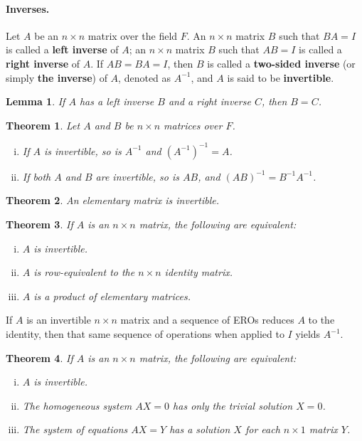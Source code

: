 \documentclass{article}
\newtheorem{theorem}{Theorem}[section]
\newtheorem*{lemma*}{Lemma}
\begin{document}
\paragraph{Inverses.} Let $A$ be an $n \times n$ matrix over the field $F$. An
$n \times n$ matrix $B$ such that $BA = I$ is called a \textbf{left inverse} of
$A$; an $n \times n$ matrix $B$ such that $AB = I$ is called a \textbf{right
inverse} of $A$. If $AB = BA = I$, then $B$ is called a \textbf{two-sided
inverse} (or simply \textbf{the inverse}) of $A$, denoted as $A^{-1}$, and $A$
is said to be \textbf{invertible}.

\begin{lemma*}
  If $A$ has a left inverse $B$ and a right inverse $C$, then $B = C$.
\end{lemma*}

\begin{theorem}
  Let $A$ and $B$ be $n \times n$ matrices over $F$.
  \begin{enumerate}[(i)]
    \item If $A$ is invertible, so is $A^{-1}$ and $(A^{-1})^{-1} = A$.
    \item If both $A$ and $B$ are invertible, so is $AB$, and $(AB)^{-1} =
      B^{-1}A^{-1}$.
  \end{enumerate}
\end{theorem}

\begin{theorem}
  An elementary matrix is invertible.
\end{theorem}

\begin{theorem}
  If $A$ is an $n \times n$ matrix, the following are equivalent:
  \begin{enumerate}[(i)]
    \item $A$ is invertible.
    \item $A$ is row-equivalent to the $n \times n$ identity matrix.
    \item $A$ is a product of elementary matrices.
  \end{enumerate}
\end{theorem}

If $A$ is an invertible $n \times n$ matrix and a sequence of EROs reduces $A$
to the identity, then that same sequence of operations when applied to $I$
yields $A^{-1}$.

\begin{theorem}
  If $A$ is an $n \times n$ matrix, the following are equivalent:
  \begin{enumerate}[(i)]
    \item $A$ is invertible.
    \item The homogeneous system $AX = 0$ has only the trivial solution $X = 0$.
    \item The system of equations $AX = Y$ has a solution $X$ for each $n \times
      1$ matrix $Y$.
  \end{enumerate}
\end{theorem}
\end{document}

